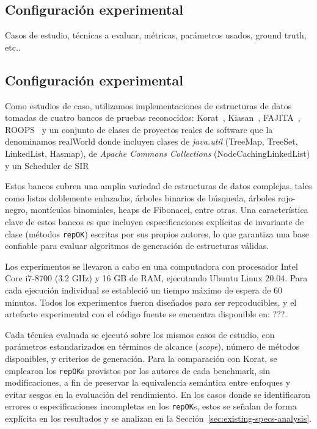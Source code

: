 \subsection{Configuración experimental}

Casos de estudio, técnicas a evaluar, métricas, parámetros usados, ground truth, etc..


\subsection{Configuración experimental}

Como estudios de caso, utilizamos implementaciones de estructuras de datos tomadas de cuatro bancos 
de pruebas reconocidos: \textsf{Korat}~\cite{Boyapati02}, \textsf{Kiasan}~\cite{Deng06}, 
\textsf{FAJITA}~\cite{Abad13}, \textsf{ROOPS}~\cite{??} y un conjunto de clases de proyectos reales de software que la denominamos \textsf{realWorld}
donde incluyen clases de \emph{java.util} (TreeMap, TreeSet, LinkedList, Hasmap), de \emph{Apache Commons Collections} (NodeCachingLinkedList) y un Scheduler de SIR

Estos bancos cubren una amplia variedad de estructuras de datos complejas, tales como listas doblemente enlazadas, árboles binarios de búsqueda, 
árboles rojo-negro, montículos binomiales, heaps de Fibonacci, entre otras. Una característica clave 
de estos bancos es que incluyen especificaciones explícitas de invariante de clase (métodos 
\texttt{repOK}) escritas por sus propios autores, lo que garantiza una base confiable para evaluar 
algoritmos de generación de estructuras válidas.

Los experimentos se llevaron a cabo en una computadora con procesador Intel Core i7-8700 
(3.2 GHz) y 16 GB de RAM, ejecutando Ubuntu Linux 20.04. Para cada ejecución individual se estableció 
un tiempo máximo de espera de 60 minutos. Todos los experimentos fueron diseñados para ser reproducibles, 
y el artefacto experimental con el código fuente se encuentra disponible en: ???.

Cada técnica evaluada se ejecutó sobre los mismos casos de estudio, con parámetros estandarizados 
en términos de alcance (\textit{scope}), número de métodos disponibles, y criterios de generación. 
Para la comparación con \textsf{Korat}, se emplearon los \texttt{repOK}s provistos por los autores 
de cada benchmark, sin modificaciones, a fin de preservar la equivalencia semántica entre enfoques 
y evitar sesgos en la evaluación del rendimiento. En los casos donde se identificaron errores o 
especificaciones incompletas en los \texttt{repOK}s, estos se señalan de forma explícita en los 
resultados y se analizan en la Sección~\ref{sec:existing-specs-analysis}.

